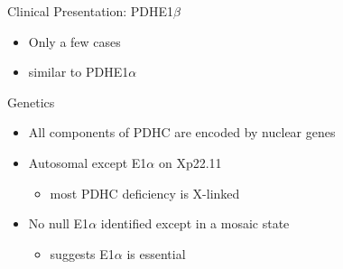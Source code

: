 \documentclass[presentation, smaller]{beamer}
\begin{document}
\begin{frame}[label={sec:orgaff1d3e}]{Clinical Presentation: PDHE1\(\beta\)}
\begin{itemize}
\item Only a few cases
\item similar to PDHE1\(\alpha\)
\end{itemize}
\end{frame}

\begin{frame}[label={sec:org9b5f6dc}]{Genetics}
\begin{itemize}
\item All components of PDHC are encoded by nuclear genes
\item Autosomal except E1\(\alpha\) on Xp22.11
\begin{itemize}
\item \therefor most PDHC deficiency is X-linked
\end{itemize}
\item No null E1\(\alpha\) identified except in a mosaic state
\begin{itemize}
\item suggests E1\(\alpha\) is essential
\end{itemize}
\end{itemize}
\end{frame}
\end{document}
